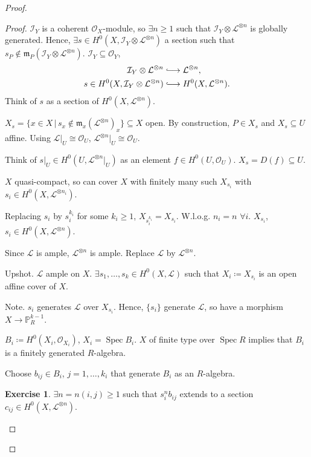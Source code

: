 \documentclass[12pt]{article}
\DeclareMathOperator{\Spec}{Spec}
\theoremstyle{definition}
\newtheorem*{exercise}{Exercise}
\theoremstyle{remark}
\begin{document}
\begin{proof}
\begin{proof}
$\mathcal{I}_Y$ is a coherent $\mathcal{O}_X$-module, so $\exists n\geq1$ such that $\mathcal{I}_Y\otimes\mathcal{L}^{\otimes n}$ is globally generated. Hence, $\exists s\in H^0(X,\mathcal{I}_Y\otimes\mathcal{L}^{\otimes n})$ a section such that $s_P\notin\mathfrak{m}_P(\mathcal{I}_Y\otimes\mathcal{L}^{\otimes n})$. $\mathcal{I}_Y\subseteq\mathcal{O}_Y$,
\begin{align*}
\mathcal{I}_Y\otimes\mathcal{L}^{\otimes n}&\lhook\joinrel\longrightarrow\mathcal{L}^{\otimes n},\\
s\in H^0(X,\mathcal{I}_Y\otimes\mathcal{L}^{\otimes n})&\lhook\joinrel\longrightarrow H^0(X,\mathcal{L}^{\otimes n}).
\end{align*}
Think of $s$ as a section of $H^0(X,\mathcal{L}^{\otimes n})$.

$X_s=\{x\in X\,|\,s_x\notin\mathfrak{m}_x(\mathcal{L}^{\otimes n})_x\}\subseteq X$ open. By construction, $P\in X_s$ and $X_s\subseteq U$ affine. Using $\mathcal{L}|_U\cong\mathcal{O}_U$, $\mathcal{L}^{\otimes n}|_U\cong\mathcal{O}_U$.

Think of $s|_U\in H^0(U,\mathcal{L}^{\otimes n}|_U)$ as an element $f\in H^0(U,\mathcal{O}_U)$. $X_s=D(f)\subseteq U$.

$X$ quasi-compact, so can cover $X$ with finitely many such $X_{s_i}$ with $s_i\in H^0(X,\mathcal{L}^{\otimes n_i})$.

Replacing $s_i$ by $s_i^{k_i}$ for some $k_i\geq1$, $X_{s_i^{k_i}}=X_{s_i}$. W.l.o.g. $n_i=n$ $\forall i$. $X_{s_i}$, $s_i\in H^0(X,\mathcal{L}^{\otimes n})$.

Since $\mathcal{L}$ is ample, $\mathcal{L}^{\otimes n}$ is ample. Replace $\mathcal{L}$ by $\mathcal{L}^{\otimes n}$.

Upshot. $\mathcal{L}$ ample on $X$. $\exists s_1,\ldots,s_k\in H^0(X,\mathcal{L})$ such that $X_i\coloneqq X_{s_i}$ is an open affine cover of $X$.

Note. $s_i$ generates $\mathcal{L}$ over $X_{s_i}$. Hence, $\{s_i\}$ generate $\mathcal{L}$, so have a morphism $X\rightarrow\mathbb{P}_R^{k-1}$.

$B_i\coloneqq H^0(X_i,\mathcal{O}_{X_i})$, $X_i=\Spec B_i$. $X$ of finite type over $\Spec R$ implies that $B_i$ is a finitely generated $R$-algebra.

Choose $b_{ij}\in B_i$, $j=1,\ldots,k_i$ that generate $B_i$ as an $R$-algebra.

\begin{exercise}
$\exists n=n(i,j)\geq1$ such that $s_i^nb_{ij}$ extends to a section $c_{ij}\in H^0(X,\mathcal{L}^{\otimes n})$.
\end{exercise}


\end{proof}
\end{proof}
\end{document}
